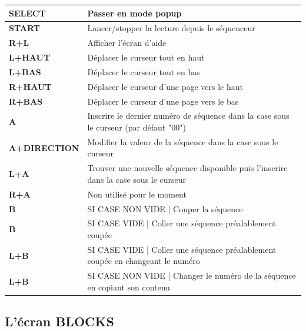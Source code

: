 \documentclass[12pt,a4paper]{article}
\begin{document}
        \tablelasttail{\hline}
        \begin{supertabular}{|l|p{11cm}|}
        \hline
            {\bf SELECT} & Passer en mode popup \\
            \hline
            {\bf START} & Lancer/stopper la lecture depuis le séquenceur \\
            \hline
            {\bf R+L} & Afficher l'écran d'aide \\
            \hline
            {\bf L+HAUT} & Déplacer le curseur tout en haut \\
            \hline
            {\bf L+BAS} & Déplacer le curseur tout en bas \\
            \hline
            {\bf R+HAUT} & Déplacer le curseur d'une page vers le haut \\
            \hline
            {\bf R+BAS} & Déplacer le curseur d'une page vers le bas \\
            \hline
            {\bf A} & Inscrire le dernier numéro de séquence dans la case sous le curseur (par défaut "00") \\
            \hline
            {\bf A+DIRECTION} & Modifier la valeur de la séquence dans la case sous le curseur \\
            \hline
            {\bf L+A} & Trouver une nouvelle séquence disponible puis l'inscrire dans la case sous le curseur \\
            \hline
            {\bf R+A} & Non utilisé pour le moment \\
            \hline
            {\bf B} & SI CASE NON VIDE | Couper la séquence \\
            \hline
            {\bf B} & SI CASE VIDE | Coller une séquence préalablement coupée \\
            \hline
            {\bf L+B} & SI CASE VIDE | Coller une séquence préalablement coupée en changeant le numéro \\
            \hline
            {\bf L+B} & SI CASE NON VIDE | Changer le numéro de la séquence en copiant son contenu \\
        \hline
        \end{supertabular}
        
    \subsection{L'écran BLOCKS}
\end{document}

